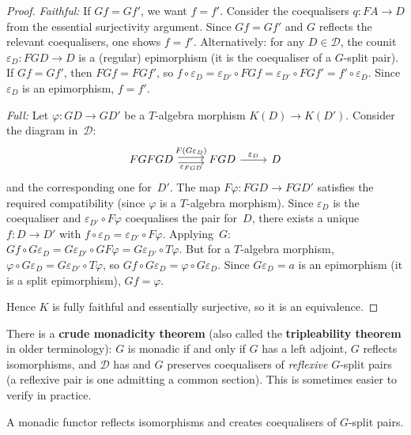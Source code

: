 \begin{proof}
\emph{Faithful:}
If $Gf = Gf'$, we want $f = f'$.  Consider the coequalisers
$q\colon FA\to D$ from the essential surjectivity argument.
Since $Gf = Gf'$ and $G$ reflects the relevant coequalisers, one
shows $f = f'$.  Alternatively: for any $D\in\mathcal{D}$,
the counit $\varepsilon_D\colon FGD\to D$ is a (regular) epimorphism
(it is the coequaliser of a $G$-split pair).
If $Gf = Gf'$, then $FGf = FGf'$, so
$f\circ\varepsilon_D = \varepsilon_{D'}\circ FGf
= \varepsilon_{D'}\circ FGf' = f'\circ\varepsilon_D$.
Since $\varepsilon_D$ is an epimorphism, $f = f'$.

\emph{Full:}
Let $\varphi\colon GD\to GD'$ be a $T$-algebra morphism
$K(D)\to K(D')$.  Consider the diagram in~$\mathcal{D}$:
\[
\begin{tikzcd}
FGFGD \arrow[r, shift left, "F(G\varepsilon_D)"]
       \arrow[r, shift right, "\varepsilon_{FGD}"'] &
FGD \arrow[r, "\varepsilon_D"] &
D
\end{tikzcd}
\]
and the corresponding one for~$D'$.  The map $F\varphi\colon FGD\to FGD'$
satisfies the required compatibility (since $\varphi$ is a $T$-algebra
morphism).  Since $\varepsilon_D$ is the coequaliser and
$\varepsilon_{D'}\circ F\varphi$ coequalises the pair for~$D$,
there exists a unique $f\colon D\to D'$ with
$f\circ\varepsilon_D = \varepsilon_{D'}\circ F\varphi$.
Applying~$G$: $Gf\circ G\varepsilon_D = G\varepsilon_{D'}\circ GF\varphi
= G\varepsilon_{D'}\circ T\varphi$.  But for a $T$-algebra morphism,
$\varphi\circ G\varepsilon_D = G\varepsilon_{D'}\circ T\varphi$, so
$Gf\circ G\varepsilon_D = \varphi\circ G\varepsilon_D$.
Since $G\varepsilon_D = a$ is an epimorphism (it is a split epimorphism),
$Gf = \varphi$.

Hence $K$ is fully faithful and essentially surjective, so it is an
equivalence.
\end{proof}

\begin{remark}\label{rem:beck-crude}
There is a \textbf{crude monadicity theorem} (also called the
\textbf{tripleability theorem} in older terminology): $G$ is monadic
if and only if $G$ has a left adjoint, $G$ reflects isomorphisms,
and $\mathcal{D}$ has and $G$ preserves coequalisers of
\emph{reflexive} $G$-split pairs (a reflexive pair is one admitting
a common section).  This is sometimes easier to verify in practice.
\end{remark}

\begin{corollary}\label{cor:monadic-reflects}
A monadic functor reflects isomorphisms and creates coequalisers of
$G$-split pairs.
\end{corollary}

